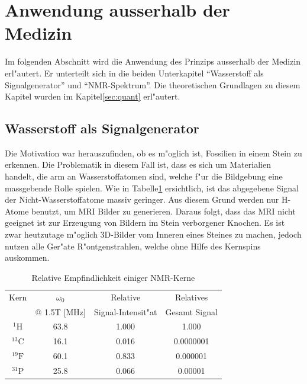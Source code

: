 \section{Anwendung ausserhalb der Medizin \label{chapter:MRI:bsp}}

Im folgenden Abschnitt wird die Anwendung des Prinzips ausserhalb der Medizin erl"autert. Er unterteilt sich in die beiden Unterkapitel "`Wasserstoff als Signalgenerator"' und "`NMR-Spektrum"'. Die theoretischen Grundlagen zu diesem Kapitel wurden im Kapitel\;\ref{sec:quant} erl"autert.

\subsection{Wasserstoff als Signalgenerator}
Die Motivation war herauszufinden, ob es m"oglich ist, Fossilien in einem Stein zu erkennen. Die Problematik in diesem Fall ist, dass es sich um Materialien handelt, die arm an Wasserstoffatomen sind, welche f"ur die Bildgebung eine massgebende Rolle spielen. Wie in Tabelle\;\ref{mri:bsp:tab:NMR_Kerne} ersichtlich, ist das abgegebene Signal der Nicht-Wasserstoffatome massiv geringer. Aus diesem Grund werden nur H-Atome benutzt, um MRI Bilder zu generieren. Daraus folgt, dass das MRI nicht geeignet ist zur Erzeugung von Bildern im Stein verborgener Knochen. Es ist zwar heutzutage m"oglich 3D-Bilder vom Inneren eines Steines zu machen, jedoch nutzen alle Ger"ate R"ontgenstrahlen, welche ohne Hilfe des Kernspins auskommen.
\begin{table}[h]
	\centering
	\begin{tabular}{|c|c|c|c|}
		\hline
		Kern 				& $\omega_0$ 	& Relative 				& Relatives\\
							& @ 1.5T [MHz] 	& Signal-Intensit"at 	& Gesamt Signal\\
		\hline
		$\mathrm{^{1}H}$ 	& 63.8 			& 1.000 				& 1.000 \\
		$\mathrm{^{13}C}$ 	& 16.1 			& 0.016 				& 0.0000001 \\
		$\mathrm{^{19}F}$ 	& 60.1 			& 0.833 				& 0.000001 \\
		$\mathrm{^{31}P}$ 	& 25.8 			& 0.066 				& 0.00001 \\
		\hline
	\end{tabular}
	\caption{Relative Empfindlichkeit einiger NMR-Kerne \cite{skript:mri:AMSM_Paper}}
	\label{mri:bsp:tab:NMR_Kerne}
\end{table}
